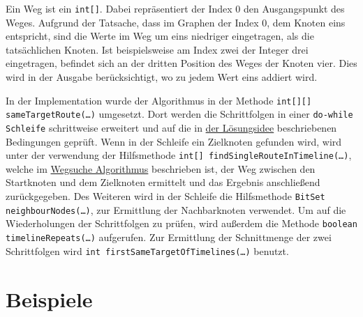 \documentclass[a4paper,10pt,ngerman]{scrartcl}
\begin{document}
    Ein Weg ist ein \texttt{int[]}.
    Dabei repräsentiert der Index 0 den Ausgangspunkt des Weges.
    Aufgrund der Tatsache,
    dass im Graphen der Index 0, dem Knoten eins entspricht,
    sind die Werte im Weg um eins niedriger eingetragen, als die tatsächlichen Knoten.
    Ist beispielsweise am Index zwei der Integer drei eingetragen,
    befindet sich an der dritten Position des Weges der Knoten vier.
    Dies wird in der Ausgabe berücksichtigt, wo zu jedem Wert eins addiert wird.

    In der Implementation wurde der Algorithmus in der Methode
    \texttt{int[][] sameTargetRoute(\ldots)} umgesetzt.
    Dort werden die Schrittfolgen in einer \texttt{do-while Schleife} schrittweise erweitert
    und auf die in \hyperref[sec:losungsidee]{der Lösungsidee} beschriebenen Bedingungen geprüft.
    Wenn in der Schleife ein Zielknoten gefunden wird, wird unter der verwendung der Hilfsmethode
    \texttt{int[] findSingleRouteInTimeline(\ldots)},
    welche im \hyperref[alg:Algorithm1]{Wegsuche Algorithmus} beschrieben ist,
    der Weg zwischen den Startknoten und dem Zielknoten ermittelt und das Ergebnis anschließend zurückgegeben.
    Des Weiteren wird in der Schleife die Hilfsmethode
    \texttt{BitSet neighbourNodes(\ldots)},
    zur Ermittlung der Nachbarknoten verwendet.
    Um auf die Wiederholungen der Schrittfolgen zu prüfen, wird außerdem die Methode
    \texttt{boolean timelineRepeats(\ldots)} aufgerufen.
    Zur Ermittlung der Schnittmenge der zwei Schrittfolgen wird
    \texttt{int firstSameTargetOfTimelines(\ldots)} benutzt.


    \section{Beispiele}\label{sec:beispiele}
        
\end{document}
